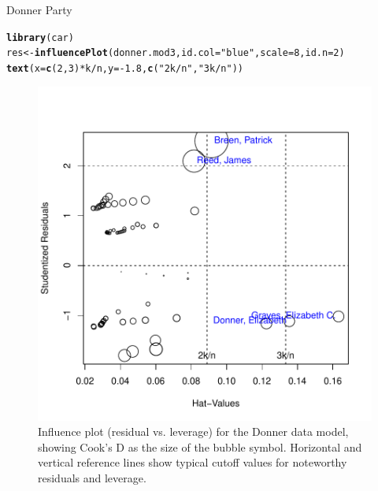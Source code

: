 \documentclass[11pt]{book}\usepackage[]{graphicx}\usepackage[]{color}
\makeatletter
\newcommand{\hlnum}[1]{\textcolor[rgb]{0.686,0.059,0.569}{#1}}%
\newcommand{\hlstr}[1]{\textcolor[rgb]{0.192,0.494,0.8}{#1}}%
\newcommand{\hlopt}[1]{\textcolor[rgb]{0,0,0}{#1}}%
\newcommand{\hlstd}[1]{\textcolor[rgb]{0.345,0.345,0.345}{#1}}%
\newcommand{\hlkwb}[1]{\textcolor[rgb]{0.69,0.353,0.396}{#1}}%
\newcommand{\hlkwc}[1]{\textcolor[rgb]{0.333,0.667,0.333}{#1}}%
\newcommand{\hlkwd}[1]{\textcolor[rgb]{0.737,0.353,0.396}{\textbf{#1}}}%
\newenvironment{kframe}{%
 \def\at@end@of@kframe{}%
 \ifinner\ifhmode%
  \def\at@end@of@kframe{\end{minipage}}%
  \begin{minipage}{\columnwidth}%
 \fi\fi%
 \def\FrameCommand##1{\hskip\@totalleftmargin \hskip-\fboxsep
 \colorbox{shadecolor}{##1}\hskip-\fboxsep
     \hskip-\linewidth \hskip-\@totalleftmargin \hskip\columnwidth}%
 \MakeFramed {\advance\hsize-\width
   \@totalleftmargin\z@ \linewidth\hsize
   \@setminipage}}%
 {\par\unskip\endMakeFramed%
 \at@end@of@kframe}
\newenvironment{knitrout}{}{} %
\renewenvironment{knitrout}{\small\renewcommand{\baselinestretch}{.85}}{} %
\makeatother
\begin{document}
\begin{Example}[donner2]{Donner Party}
\begin{knitrout}
\color{fgcolor}\begin{kframe}
\begin{alltt}
\hlkwd{library}\hlstd{(car)}
\hlstd{res} \hlkwb{<-} \hlkwd{influencePlot}\hlstd{(donner.mod3,} \hlkwc{id.col}\hlstd{=}\hlstr{"blue"}\hlstd{,} \hlkwc{scale}\hlstd{=}\hlnum{8}\hlstd{,} \hlkwc{id.n}\hlstd{=}\hlnum{2}\hlstd{)}
\hlkwd{text}\hlstd{(}\hlkwc{x}\hlstd{=}\hlkwd{c}\hlstd{(}\hlnum{2}\hlstd{,} \hlnum{3}\hlstd{)}\hlopt{*}\hlstd{k}\hlopt{/}\hlstd{n,} \hlkwc{y}\hlstd{=}\hlopt{-}\hlnum{1.8}\hlstd{,} \hlkwd{c}\hlstd{(}\hlstr{"2k/n"}\hlstd{,} \hlstr{"3k/n"}\hlstd{))}
\end{alltt}
\end{kframe}\begin{figure}[!htbp]


\centerline{\includegraphics[width=.6\textwidth]{ch07/fig/donner2-inflplot-1} }

\caption[Influence plot (residual vs]{Influence plot (residual vs. leverage) for the Donner data model, showing Cook's D as the size of the bubble symbol. Horizontal and vertical reference lines show typical cutoff values for noteworthy residuals and leverage.\label{fig:donner2-inflplot}}
\end{figure}


\end{knitrout}


\end{Example}
\end{document}
